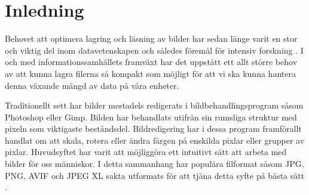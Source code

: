 \section*{Inledning}


Behovet att optimera lagring och läsning av bilder har sedan länge varit en stor och viktig del inom datavetenskapen och således föremål för intensiv forskning \cite{gonzalez2017digital-global}. I och med informationssamhällets framväxt har det uppstått ett allt större behov av att kunna lagra filerna så kompakt som möjligt för att vi ska kunna hantera denna växande mängd av data på våra enheter. %

Traditionellt sett har bilder mestadels redigerats i bildbehandlingsprogram såsom Photoshop eller Gimp. Bilden har behandlats utifrån sin rumsliga struktur med pixeln som viktigaste beståndsdel. Bildredigering har i dessa program framförallt handlat om att skala, rotera eller ändra färgen på enskilda pixlar eller grupper av pixlar. Huvudsyftet har varit att möjliggöra ett intuitivt sätt att arbeta med bilder för oss människor. I detta sammanhang har populära filformat såsom JPG, PNG, AVIF och JPEG XL sakta utformats för att tjäna detta syfte på bästa sätt \cite{gonzalez2017digital-global, sayood2012introduction}. 


